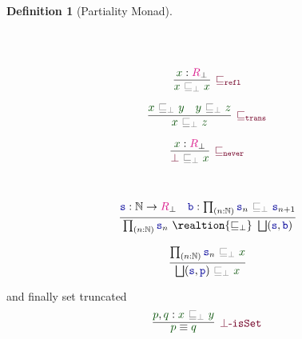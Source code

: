 \documentclass[twoside,11pt,openright]{report}
\theoremstyle{plain} %
\theoremstyle{definition}
\newtheorem{defn}{Definition}[section]
\theoremstyle{remark}
\newcommand*{\term}[1]{\textcolor{green!30!black}{#1}} %
\newcommand*{\type}[1]{\textcolor{magenta!90!black}{#1}}
\newcommand*{\relation}[1]{\textcolor{gray}{\ensuremath{\mathtt{#1}}}}
\newcommand*{\function}[1]{\textcolor{blue!60!black}{\ensuremath{\mathtt{#1}}}}
\newcommand*{\constructor}[1]{\textcolor{purple!60!black}{\ensuremath{\mathtt{#1}}}}
\begin{document}
\begin{defn}[Partiality Monad]
\begin{center}
\begin{minipage}{0.45\linewidth}
\begin{equation}
      \end{equation}
    \end{minipage}
  \end{center}
  \strut\\[-15mm]
  \begin{center}
    \begin{minipage}{0.25\linewidth}
      \begin{equation}
        \infer[\constructor{\sqsubseteq_{refl}}]{\term{x}~\relation{\sqsubseteq_{\bot}}~\term{x}}{\term{x} : \type{R}_\bot}
      \end{equation}
    \end{minipage}
    \hfill
    \begin{minipage}{0.35\linewidth}
      \begin{equation}
        \infer[\constructor{\sqsubseteq_{trans}}]{\term{x}~\relation{\sqsubseteq_{\bot}}~\term{z}}{\term{x}~\relation{\sqsubseteq_{\bot}}~\term{y} & \term{y}~\relation{\sqsubseteq_{\bot}}~\term{z}}
      \end{equation}
    \end{minipage}
    \hfill
    \begin{minipage}{0.25\linewidth}
      \begin{equation}
        \infer[\constructor{\sqsubseteq_{never}}]{\constructor{\bot}~\relation{\sqsubseteq_{\bot}}~\term{x}}{\term{x} : \type{R}_\bot}
      \end{equation}
    \end{minipage}
  \end{center}
  \strut\\[-15mm]
  \begin{center}
    \hfill
    \begin{minipage}{0.50\linewidth}
      \begin{equation}
        \infer{\prod_{(n:\mathbb{N})} \function{s}_n~\realtion{\sqsubseteq_{\bot}}~\bigsqcup(\function{s},\function{b})}{\function{s} : \mathbb{N} \rightarrow \type{R}_\bot & \function{b} : \prod_{(n : \mathbb{N})} \function{s}_n~\relation{\sqsubseteq_{\bot}}~\function{s}_{n+1} }
      \end{equation}
    \end{minipage}
    \hfill
    \begin{minipage}{0.3\linewidth}
      \begin{equation}
        \infer{\bigsqcup(\function{s},\function{p})~\relation{\sqsubseteq_{\bot}}~\term{x}}{\prod_{(n:\mathbb{N})} \function{s}_n~\relation{\sqsubseteq_{\bot}}~\term{x}}
      \end{equation}
    \end{minipage}
  \end{center}
  and finally set truncated
  \begin{equation}
    \infer[\constructor{\bot\text{-}isSet}]{\term{p} \equiv \term{q}}{\term{p} , \term{q} : \term{x}~\relation{\sqsubseteq_{\bot}}~\term{y}}
  \end{equation}
\end{defn}
\end{document}
